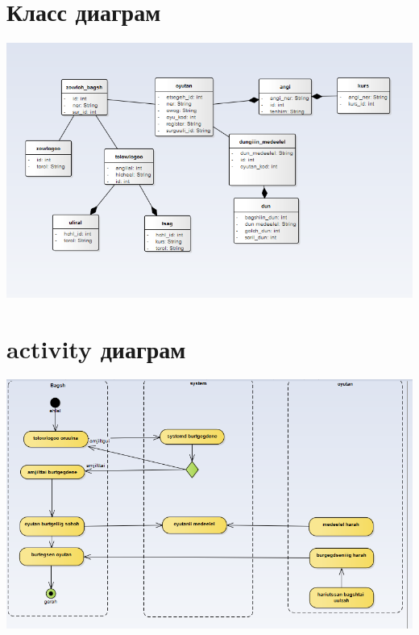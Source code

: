 \documentclass[12pt]{article}
\begin{document}
\begin{enumerate}
		\section{Класс диаграм}
		\includegraphics[scale=0.6]{class.png}
		\section{activity диаграм}
		\includegraphics[scale=0.6]{activity.png}
	\end{enumerate}
\end{document}
